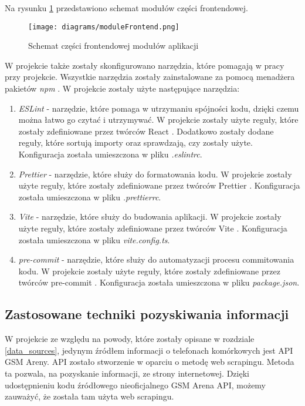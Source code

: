 Na rysunku \ref{module_frontend} przedstawiono schemat modułów części frontendowej.

\begin{figure}[H]
    \centering
    \texttt{[image: diagrams/moduleFrontend.png]}
    \caption{Schemat części frontendowej modułów aplikacji}
    \label{module_frontend}
\end{figure}

W projekcie także zostały skonfigurowano narzędzia, które pomagają w pracy przy projekcie. Wszystkie narzędzia zostały zainstalowane za pomocą menadżera pakietów \textit{npm} \cite{npm}. W projekcie zostały użyte następujące narzędzia:
\begin{enumerate}
    \item \textit{ESLint} \cite{ESLint} - narzędzie, które pomaga w utrzymaniu spójności kodu, dzięki czemu można łatwo go czytać i utrzymywać. W projekcie zostały użyte reguły, które zostały zdefiniowane przez twórców React \cite{React}. Dodatkowo zostały dodane reguły, które sortują importy oraz sprawdzają, czy zostały użyte. Konfiguracja została umieszczona w pliku \textit{.eslintrc}.
    \item \textit{Prettier} \cite{Prettier} - narzędzie, które służy do formatowania kodu. W projekcie zostały użyte reguły, które zostały zdefiniowane przez twórców Prettier \cite{Prettier}. Konfiguracja została umieszczona w pliku \textit{.prettierrc}.
    \item \textit{Vite} \cite{vite} - narzędzie, które służy do budowania aplikacji. W projekcie zostały użyte reguły, które zostały zdefiniowane przez twórców Vite \cite{vite}. Konfiguracja została umieszczona w pliku \textit{vite.config.ts}.
    \item \textit{pre-commit} \cite{pre_commit} - narzędzie, które służy do automatyzacji procesu commitowania kodu. W projekcie zostały użyte reguły, które zostały zdefiniowane przez twórców pre-commit \cite{pre_commit}. Konfiguracja została umieszczona w pliku \textit{package.json}.
\end{enumerate}

\subsection{Zastosowane techniki pozyskiwania informacji}
W projekcie ze względu na powody, które zostały opisane w rozdziale \ref{data_sources}, jedynym źródłem informacji o telefonach komórkowych jest API GSM Areny. API zostało stworzenie w oparciu o metodę web scrapingu. Metoda ta pozwala, na pozyskanie informacji, ze strony internetowej. Dzięki udostępnieniu kodu źródłowego nieoficjalnego GSM Arena API\cite{gsm_arena_api}, możemy zauważyć, że została tam użyta web scrapingu.

